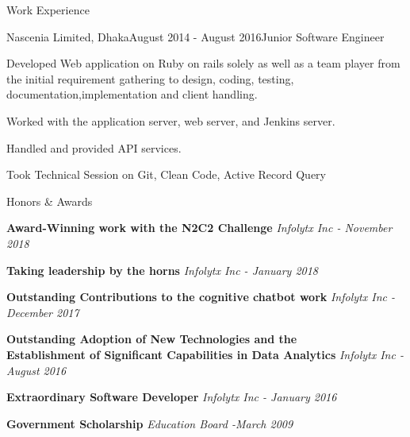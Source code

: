 \documentclass{resume} %
\begin{document}
\begin{rSection}{Work Experience}
\begin{rSubsection}{Nascenia Limited, Dhaka}{August 2014 - August 2016}{Junior Software Engineer}{}
\item Developed Web application on Ruby on rails solely as well as a team player from the initial requirement gathering to design, coding, testing, documentation,implementation and client handling.
\item Worked with the application server, web server, and Jenkins server.
\item Handled and provided API services. 
\item Took Technical Session on Git, Clean Code, Active Record Query 
\end{rSubsection}

\end{rSection}





\begin{rSection}{Honors \& Awards}

{\bf Award-Winning work with the N2C2 Challenge}  \hfill {\em Infolytx Inc - November 2018} 


{\bf Taking leadership by the horns} \hfill {\em Infolytx Inc - January 2018} 

{\bf Outstanding Contributions to the cognitive chatbot work} \hfill {\em Infolytx Inc - December 2017} 

{\bf Outstanding Adoption of New Technologies and the\\ Establishment of Significant Capabilities in Data Analytics} \hfill {\em Infolytx Inc - August 2016} 

{\bf Extraordinary Software Developer} \hfill {\em Infolytx Inc - January 2016} 

{\bf Government Scholarship} \hfill {\em Education Board -March 2009} 

\end{rSection}

\end{document}
